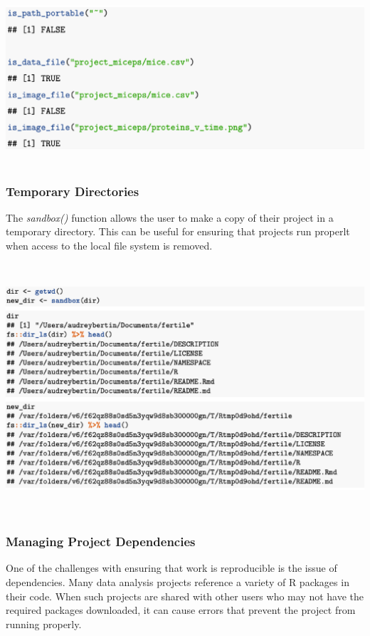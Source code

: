 \documentclass[APA,LATO1COL]{WileyNJD-v2}
\begin{document}
\vskip 0.25in

\centerline{\includegraphics[height=15pc,width=180mm]{fig-10}}

\vskip 0.25in

\subsubsection{Temporary Directories}

The \textit{sandbox()} function allows the user to make a copy of their project in a temporary directory. This can be useful for ensuring that projects run properlt when access to the local file system is removed.

\vskip 0.25in

\centerline{\includegraphics[height=22pc,width=180mm]{fig-11}}

\vskip 0.25in

\subsubsection{Managing Project Dependencies}


One of the challenges with ensuring that work is reproducible is the issue of dependencies. Many data analysis projects reference a variety of R packages in their code. When such projects are shared with other users who may not have the required packages downloaded, it can cause errors that prevent the project from running properly. 
\end{document}
